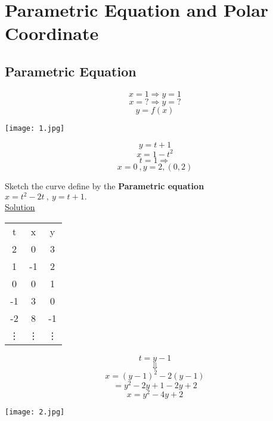 \setcounter{chapter}{9}
\chapter{Parametric Equation and Polar Coordinate}
\section{Parametric Equation}
\noindent
\hfill
\begin{minipage}{0.3\textwidth}
$$x=1\Rightarrow y=1$$
$$x=?\Rightarrow y=?$$
$$y=f(x)$$
\end{minipage}
\begin{minipage}{0.3\textwidth}
\texttt{[image: 1.jpg]}
\end{minipage}
\begin{minipage}{0.3\textwidth}
$$y=t+1$$
$$x=1-t^2$$
$$t=1\Rightarrow $$
$$x=0~,y=2,(0,2)$$
\end{minipage}
\noindent{\color{smalt(darkpowderblue)}\rule{\linewidth}{.2mm}}
\begin{example}
Sketch the curve define by the \textbf{\color{smalt(darkpowderblue)} Parametric equation}\\
$x=t^2-2t~,~y=t+1.$\\
\underline{\textbf{\large}\color{smalt(darkpowderblue)}Solution} \\
\begin{minipage}{0.25\textwidth}
	\begin{tabular}{ |c | c | c | }
	\hline
	t & x & y \\
{\color{red}2} & {\color{red}0} & {\color{red}3}\\
{\color{red}1} & {\color{red}-1} & {\color{red}2}\\
		0 & 0 & 1\\
{\color{red}-1} & {\color{red}3}& {\color{red}0}\\
{\color{red}-2} & {\color{red}8}& {\color{red}-1}\\
        \vdots &\vdots &\vdots
	\end{tabular}
\end{minipage}
\begin{minipage}{0.35\textwidth}
{\color{smalt(darkpowderblue)}$$t=y-1$$
$$\Downarrow$$
$$x=(y-1)^2-2(y-1)$$
$$=y^2-2y+1-2y+2$$
$$x=y^2-4y+2$$}
\end{minipage}
\begin{minipage}{0.6\textwidth}
\texttt{[image: 2.jpg]}
\end{minipage}
\end{example}
